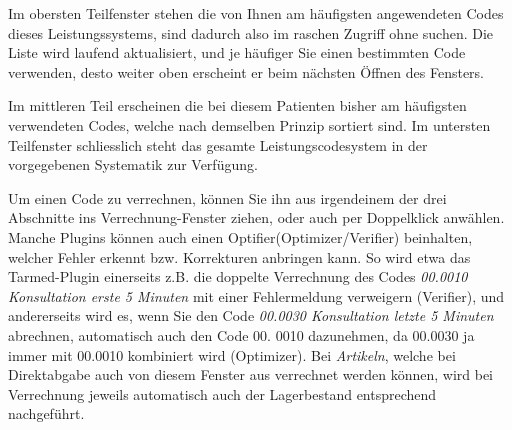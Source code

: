 Im obersten Teilfenster stehen die von Ihnen am häufigsten angewendeten Codes dieses Leistungssystems, sind dadurch also im raschen Zugriff ohne suchen. Die Liste wird laufend aktualisiert, und je häufiger Sie einen bestimmten Code verwenden, desto weiter oben erscheint er beim nächsten Öffnen des Fensters.

\medskip
Im mittleren Teil erscheinen die bei diesem Patienten bisher am häufigsten verwendeten Codes, welche nach demselben Prinzip sortiert sind. Im untersten Teilfenster schliesslich steht das gesamte Leistungscodesystem in der vorgegebenen Systematik zur Verfügung.

\bigskip

Um einen Code zu verrechnen, können Sie ihn  aus irgendeinem der drei Abschnitte ins Verrechnung-Fenster ziehen, oder auch per Doppelklick anwählen. Manche Plugins können auch einen \glqq Optifier\grqq (Optimizer/Verifier) beinhalten, welcher Fehler erkennt bzw. Korrekturen anbringen kann. So wird etwa das Tarmed-Plugin einerseits z.B. die doppelte Verrechnung des Codes \textit{00.0010 Konsultation erste 5 Minuten} mit einer Fehlermeldung verweigern (Verifier), und andererseits wird es, wenn Sie den Code \textit{00.0030 Konsultation letzte 5 Minuten} abrechnen, automatisch auch den Code 00. 0010 dazunehmen, da 00.0030 ja immer mit 00.0010 kombiniert wird (Optimizer).
Bei \textit{Artikeln}, welche bei Direktabgabe auch von diesem Fenster aus verrechnet werden können, wird bei Verrechnung jeweils automatisch auch der Lagerbestand entsprechend nachgeführt.

